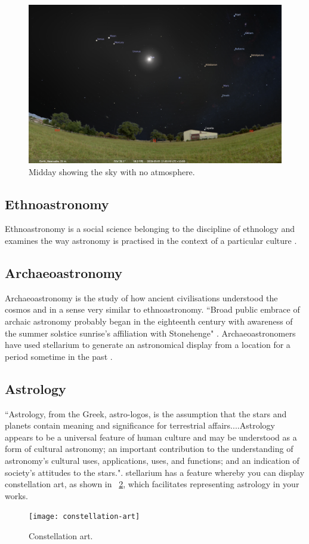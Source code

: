 \begin{figure}[ht]
	\centerline{\includegraphics[width=1\columnwidth]{no-atmosphere.png}}
	\caption{\label{fig_no-atmosphere}{Midday showing the sky with no atmosphere.}}
\end{figure}


\subsection{Ethnoastronomy}
Ethnoastronomy is a social science belonging to the discipline of ethnology and examines the way astronomy is practised in the context of a particular culture \cite{Salt2015}.

\subsection{Archaeoastronomy}
Archaeoastronomy is the study of how ancient civilisations understood the cosmos and in a sense very similar to ethnoastronomy.
``Broad public embrace of archaic astronomy probably began in the eighteenth
century with awareness of the summer solstice sunrise’s affiliation with Stonehenge" \cite[p.~263]{Krupp2015}.
Archaeoastronomers have used stellarium to generate an astronomical display from a location for a period sometime in the past \cite{zotti2014towards}.

\subsection{Astrology}
``Astrology, from the Greek, astro-logos, is the assumption that the stars and planets
contain meaning and significance for terrestrial affairs....Astrology appears to
be a universal feature of human culture and may be understood as a form of cultural
astronomy; an important contribution to the understanding of astronomy’s cultural
uses, applications, uses, and functions; and an indication of society’s attitudes to the
stars."\cite[p.~104]{Campion2015}. stellarium has a feature whereby you can display constellation art, as shown in ~\ref{fig_constellation-art}, which facilitates representing astrology in your works.

\begin{figure}[ht]
	\centerline{\texttt{[image: constellation-art]}}
	\caption{\label{fig_constellation-art}{Constellation art.}}
\end{figure}


	
